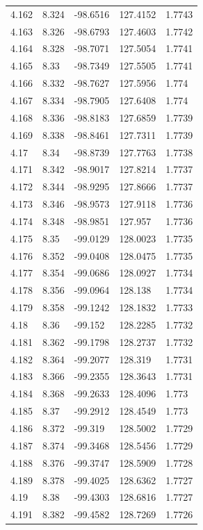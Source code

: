 \begin{tabular}{lllll}
4.162 & 8.324 & -98.6516 & 127.4152 & 1.7743 \\
4.163 & 8.326 & -98.6793 & 127.4603 & 1.7742 \\
4.164 & 8.328 & -98.7071 & 127.5054 & 1.7741 \\
4.165 & 8.33 & -98.7349 & 127.5505 & 1.7741 \\
4.166 & 8.332 & -98.7627 & 127.5956 & 1.774 \\
4.167 & 8.334 & -98.7905 & 127.6408 & 1.774 \\
4.168 & 8.336 & -98.8183 & 127.6859 & 1.7739 \\
4.169 & 8.338 & -98.8461 & 127.7311 & 1.7739 \\
4.17 & 8.34 & -98.8739 & 127.7763 & 1.7738 \\
4.171 & 8.342 & -98.9017 & 127.8214 & 1.7737 \\
4.172 & 8.344 & -98.9295 & 127.8666 & 1.7737 \\
4.173 & 8.346 & -98.9573 & 127.9118 & 1.7736 \\
4.174 & 8.348 & -98.9851 & 127.957 & 1.7736 \\
4.175 & 8.35 & -99.0129 & 128.0023 & 1.7735 \\
4.176 & 8.352 & -99.0408 & 128.0475 & 1.7735 \\
4.177 & 8.354 & -99.0686 & 128.0927 & 1.7734 \\
4.178 & 8.356 & -99.0964 & 128.138 & 1.7734 \\
4.179 & 8.358 & -99.1242 & 128.1832 & 1.7733 \\
4.18 & 8.36 & -99.152 & 128.2285 & 1.7732 \\
4.181 & 8.362 & -99.1798 & 128.2737 & 1.7732 \\
4.182 & 8.364 & -99.2077 & 128.319 & 1.7731 \\
4.183 & 8.366 & -99.2355 & 128.3643 & 1.7731 \\
4.184 & 8.368 & -99.2633 & 128.4096 & 1.773 \\
4.185 & 8.37 & -99.2912 & 128.4549 & 1.773 \\
4.186 & 8.372 & -99.319 & 128.5002 & 1.7729 \\
4.187 & 8.374 & -99.3468 & 128.5456 & 1.7729 \\
4.188 & 8.376 & -99.3747 & 128.5909 & 1.7728 \\
4.189 & 8.378 & -99.4025 & 128.6362 & 1.7727 \\
4.19 & 8.38 & -99.4303 & 128.6816 & 1.7727 \\
4.191 & 8.382 & -99.4582 & 128.7269 & 1.7726 \\

\end{tabular}
